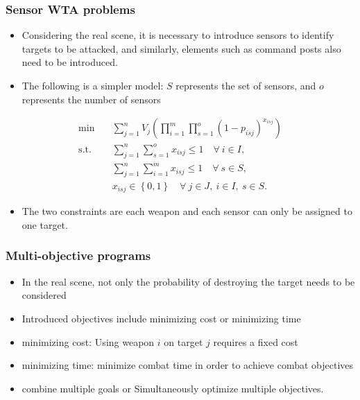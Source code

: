 \documentclass[CJK,10pt]{beamer}
\begin{document}
\begin{frame}
    \frametitle{Sensor WTA problems}
    \begin{itemize}
        \item Considering the real scene, it is necessary to introduce sensors to identify targets to be attacked, and similarly, elements such as command posts also need to be introduced.
        \item The following is a simpler model: $S$ represents the set of sensors, and $o$ represents the number of sensors
    \end{itemize}
    \begin{align*} \tag{Sensor}
        \min\quad & \sum_{j=1}^n V_j \left( \prod_{i=1}^m {\prod_{s = 1}^{o} (1 -  p_{isj})^{x_{isj}}} \right) \\ 
        \mathrm{s. t.}\quad &\sum_{j=1}^n {\sum_{s=1}^o x_{isj}} \leq 1\quad \forall ~i \in I,\\
        &\sum_{j=1}^n {\sum_{i=1}^m x_{isj}} \leq 1\quad \forall ~s \in S,\\
        & x_{isj} \in \left\{ 0,1 \right\} \quad \forall~ j\in J , ~ i \in I,~ s\in S.
    \end{align*}
    \begin{itemize}
        \item The two constraints are each weapon and each sensor can only be assigned to one target.
    \end{itemize}
\end{frame}

\begin{frame}
    \frametitle{Multi-objective programs}
    \begin{itemize}
        \item In the real scene, not only the probability of destroying the target needs to be considered
        \item Introduced objectives include minimizing cost or minimizing time
        \item minimizing cost: Using weapon $i$ on target $j$ requires a fixed cost
        \item minimizing time: minimize combat time in order to achieve combat objectives
        \item combine multiple goals or Simultaneously optimize multiple objectives.
    \end{itemize}
\end{frame}
\end{document}
